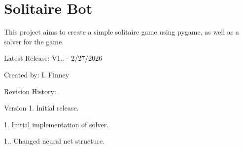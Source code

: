 \chapter{Solitaire Bot }
\hypertarget{index}{}\label{index}
This project aims to create a simple solitaire game using pygame, as well as a solver for the game. \begin{DoxyParagraph}{Latest Release\+:}
V1.. -\/ 2/27/2026 
\end{DoxyParagraph}
\begin{DoxyParagraph}{Created by\+: I. Finney}

\end{DoxyParagraph}
\begin{DoxyParagraph}{Revision History\+:}

\end{DoxyParagraph}
\begin{DoxyVersion}{Version}
1. Initial release. 

1. Initial implementation of solver. 

1.. Changed neural net structure. 
\end{DoxyVersion}
